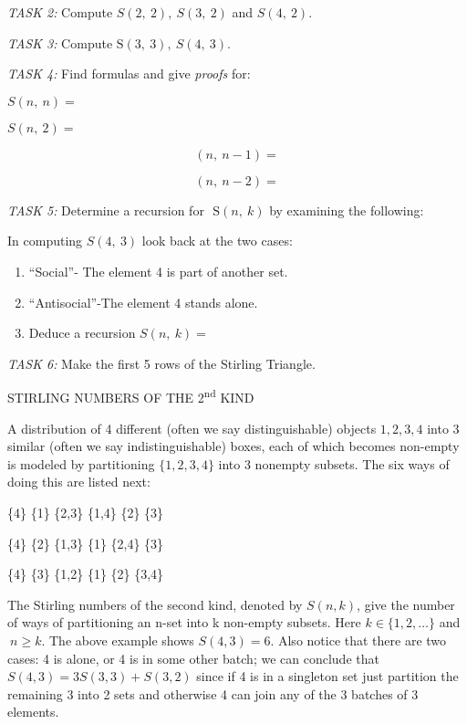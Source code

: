 \documentclass[10pt,letter]{article}
\begin{document}
\emph{TASK 2:} Compute \(S\left( 2,\ 2 \right),\ S(3,\ 2)\) and
\(S(4,\ 2)\).

\emph{TASK 3:} Compute\(\text{\ S}\left( 3,\ 3 \right),\ S(4,\ 3)\).

\emph{TASK 4:} Find formulas and give \emph{proofs} for:

\(S\left( n,\ n \right) =\)

\(S\left( n,\ 2 \right) =\)

\[
\left( n,\ n - 1 \right) =
\]

\[
\left( n,\ n - 2 \right) =
\]

\emph{TASK 5:} Determine a recursion for
\(\text{\ S}\left( n,\ k \right)\) by examining the following:

In computing \(S\left( 4,\ 3 \right)\) look back at the two cases:
\begin{enumerate}
\def\labelenumi{(\alph{enumi})}

\item
  ``Social''- The element 4 is part of another set.
\item
  ``Antisocial''-The element 4 stands alone.
\item
  Deduce a recursion \(S\left( n,\ k \right) =\)

\end{enumerate}

\emph{TASK 6:} Make the first 5 rows of the Stirling Triangle.

STIRLING NUMBERS OF THE 2\textsuperscript{nd} KIND

A distribution of 4 different (often we say distinguishable) objects
\(1,2,3,4\) into 3 similar (often we say indistinguishable) boxes, each
of which becomes non-empty is modeled by partitioning \(\{ 1,2,3,4\}\)
into 3 nonempty subsets. The six ways of doing this are listed next:

\{4\} \{1\} \{2,3\} \{1,4\} \{2\} \{3\}

\{4\} \{2\} \{1,3\} \{1\} \{2,4\} \{3\}

\{4\} \{3\} \{1,2\} \{1\} \{2\} \{3,4\}

The Stirling numbers of the second kind, denoted by \(S(n,k)\), give the
number of ways of partitioning an n-set into k non-empty subsets. Here
\(k \in \{ 1,2,\ldots\}\) and\(\ n \geq k\). The above example shows
\(S\left( 4,3 \right) = 6\). Also notice that there are two cases: 4 is
alone, or 4 is in some other batch; we can conclude that
\(S\left( 4,3 \right) = 3S\left( 3,3 \right) + S(3,2)\) since if 4 is in
a singleton set just partition the remaining 3 into 2 sets and otherwise
4 can join any of the 3 batches of 3 elements.
\end{document}
